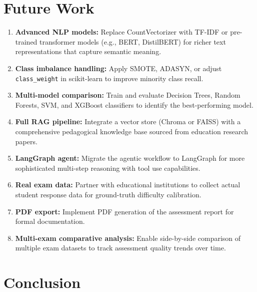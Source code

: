 \documentclass[12pt, a4paper]{article}
\begin{document}
\section{Future Work}
\label{sec:future}

\begin{enumerate}
    \item \textbf{Advanced NLP models:} Replace CountVectorizer with TF-IDF or pre-trained transformer models (e.g., BERT, DistilBERT) for richer text representations that capture semantic meaning.
    
    \item \textbf{Class imbalance handling:} Apply SMOTE, ADASYN, or adjust \texttt{class\_weight} in scikit-learn to improve minority class recall.
    
    \item \textbf{Multi-model comparison:} Train and evaluate Decision Trees, Random Forests, SVM, and XGBoost classifiers to identify the best-performing model.
    
    \item \textbf{Full RAG pipeline:} Integrate a vector store (Chroma or FAISS) with a comprehensive pedagogical knowledge base sourced from education research papers.
    
    \item \textbf{LangGraph agent:} Migrate the agentic workflow to LangGraph for more sophisticated multi-step reasoning with tool use capabilities.
    
    \item \textbf{Real exam data:} Partner with educational institutions to collect actual student response data for ground-truth difficulty calibration.
    
    \item \textbf{PDF export:} Implement PDF generation of the assessment report for formal documentation.
    
    \item \textbf{Multi-exam comparative analysis:} Enable side-by-side comparison of multiple exam datasets to track assessment quality trends over time.
\end{enumerate}

\section{Conclusion}
\label{sec:conclusion}
\end{document}
